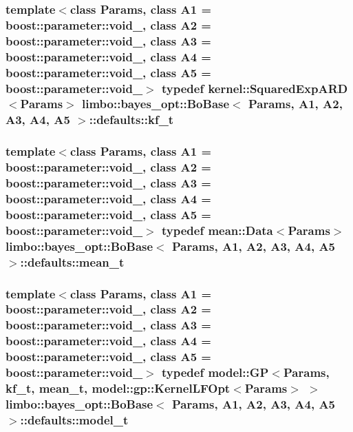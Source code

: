 \subsubsection[{kf\+\_\+t}]{\setlength{\rightskip}{0pt plus 5cm}template$<$class Params, class A1 = boost\+::parameter\+::void\+\_\+, class A2 = boost\+::parameter\+::void\+\_\+, class A3 = boost\+::parameter\+::void\+\_\+, class A4 = boost\+::parameter\+::void\+\_\+, class A5 = boost\+::parameter\+::void\+\_\+$>$ typedef {\bf kernel\+::\+Squared\+Exp\+A\+R\+D}$<$Params$>$ {\bf limbo\+::bayes\+\_\+opt\+::\+Bo\+Base}$<$ Params, A1, A2, A3, A4, A5 $>$\+::{\bf defaults\+::kf\+\_\+t}}\label{structlimbo_1_1bayes__opt_1_1_bo_base_1_1defaults_aec54234d95d97261acf5aacca83eecaa}
\hypertarget{structlimbo_1_1bayes__opt_1_1_bo_base_1_1defaults_aa8dcb3af9a3dffffb4749104cd27a597}{}
\subsubsection[{mean\+\_\+t}]{\setlength{\rightskip}{0pt plus 5cm}template$<$class Params, class A1 = boost\+::parameter\+::void\+\_\+, class A2 = boost\+::parameter\+::void\+\_\+, class A3 = boost\+::parameter\+::void\+\_\+, class A4 = boost\+::parameter\+::void\+\_\+, class A5 = boost\+::parameter\+::void\+\_\+$>$ typedef {\bf mean\+::\+Data}$<$Params$>$ {\bf limbo\+::bayes\+\_\+opt\+::\+Bo\+Base}$<$ Params, A1, A2, A3, A4, A5 $>$\+::{\bf defaults\+::mean\+\_\+t}}\label{structlimbo_1_1bayes__opt_1_1_bo_base_1_1defaults_aa8dcb3af9a3dffffb4749104cd27a597}
\hypertarget{structlimbo_1_1bayes__opt_1_1_bo_base_1_1defaults_a6f8da6a743f6a87096f8e0b9d4411503}{}
\subsubsection[{model\+\_\+t}]{\setlength{\rightskip}{0pt plus 5cm}template$<$class Params, class A1 = boost\+::parameter\+::void\+\_\+, class A2 = boost\+::parameter\+::void\+\_\+, class A3 = boost\+::parameter\+::void\+\_\+, class A4 = boost\+::parameter\+::void\+\_\+, class A5 = boost\+::parameter\+::void\+\_\+$>$ typedef {\bf model\+::\+G\+P}$<$Params, {\bf kf\+\_\+t}, {\bf mean\+\_\+t}, {\bf model\+::gp\+::\+Kernel\+L\+F\+Opt}$<$Params$>$ $>$ {\bf limbo\+::bayes\+\_\+opt\+::\+Bo\+Base}$<$ Params, A1, A2, A3, A4, A5 $>$\+::{\bf defaults\+::model\+\_\+t}}\label{structlimbo_1_1bayes__opt_1_1_bo_base_1_1defaults_a6f8da6a743f6a87096f8e0b9d4411503}
\hypertarget{structlimbo_1_1bayes__opt_1_1_bo_base_1_1defaults_a70f64f21a85e2fa25063709abd5a2467}{}
